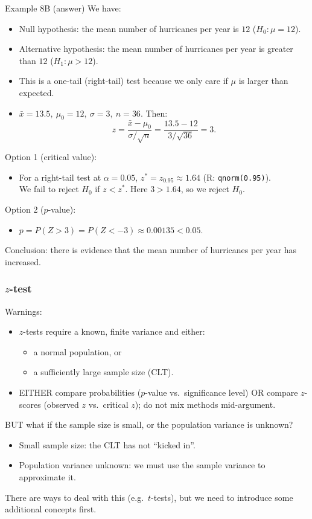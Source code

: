 \documentclass[t,8pt]{beamer}
\begin{document}
\begin{frame}{Example 8B (answer)}
	We have:
	\begin{itemize}
		\item Null hypothesis: the mean number of hurricanes per year is $12$ ($H_0:\mu=12$).
		\item Alternative hypothesis: the mean number of hurricanes per year is greater than $12$ ($H_1:\mu>12$).
		\item This is a one-tail (right-tail) test because we only care if $\mu$ is larger than expected.
		\item $\bar x=13.5,\ \mu_0=12,\ \sigma=3,\ n=36$. Then:
		\[
		z=\frac{\bar x-\mu_0}{\sigma/\sqrt n}
		=\frac{13.5-12}{3/\sqrt{36}}
		=3.
		\]
	\end{itemize}
	Option 1 (critical value):
	\begin{itemize}
		\item For a right-tail test at $\alpha=0.05$, $z^* = z_{0.95}\approx 1.64$ (R: {\tt qnorm(0.95)}).\\
		We fail to reject $H_0$ if $z<z^*$. Here $3>1.64$, so we reject $H_0$.
	\end{itemize}
	Option 2 ($p$-value):
	\begin{itemize}
		\item $p = P(Z>3)=P(Z<-3)\approx 0.00135<0.05$.
	\end{itemize}
	Conclusion: there is evidence that the mean number of hurricanes per year has increased.
\end{frame}

\begin{frame}
	\frametitle{$z$-test}
	Warnings:
	\begin{itemize}
		\item $z$-tests require a known, finite variance and either:
		\begin{itemize}
			\item a normal population, or
			\item a sufficiently large sample size (CLT).
		\end{itemize}
		\item EITHER compare probabilities ($p$-value vs.\ significance level) OR compare $z$-scores (observed $z$ vs.\ critical $z$); do not mix methods mid-argument.
	\end{itemize}
	BUT what if the sample size is small, or the population variance is unknown?
	\begin{itemize}
		\item Small sample size: the CLT has not ``kicked in''.
		\item Population variance unknown: we must use the sample variance to approximate it.
	\end{itemize}
	There are ways to deal with this (e.g.\ $t$-tests), but we need to introduce some additional concepts first.
\end{frame}
\end{document}
